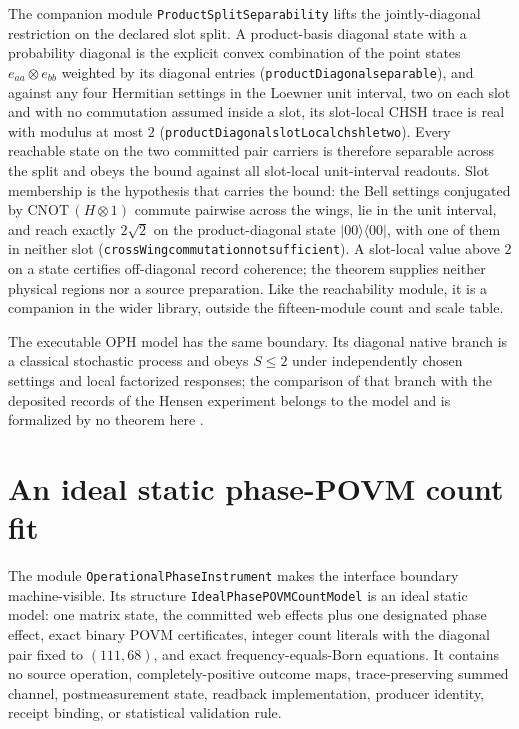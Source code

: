 \documentclass[11pt]{article}
\renewcommand{\_}{\textunderscore\allowbreak}
\theoremstyle{remark}
\begin{document}
The companion module \texttt{ProductSplitSeparability} lifts the jointly-diagonal
restriction on the declared slot split. A product-basis diagonal state with a probability
diagonal is the explicit convex combination of the point states $e_{aa}\otimes e_{bb}$
weighted by its diagonal entries (\texttt{productDiagonal\_separable}), and against any
four Hermitian settings in the Loewner unit interval, two on each slot and with no
commutation assumed inside a slot, its slot-local CHSH trace is real with modulus at most
$2$ (\texttt{productDiagonal\_slotLocal\_chsh\_le\_two}). Every reachable state on the
two committed pair carriers is therefore separable across the split and obeys the bound
against all slot-local unit-interval readouts. Slot membership is the hypothesis that carries
the bound: the Bell
settings conjugated by $\mathrm{CNOT}\,(H\otimes1)$ commute pairwise across the wings, lie
in the unit interval, and reach exactly $2\sqrt2$ on the product-diagonal state
$|00\rangle\langle00|$, with one of them in neither slot
(\texttt{crossWing\_commutation\_not\_sufficient}). A slot-local value above $2$ on a state certifies
off-diagonal record coherence; the theorem supplies neither physical regions nor a source preparation.
Like the reachability module, it is a companion in the wider library, outside the
fifteen-module count and scale table.

The executable OPH model has the same boundary. Its diagonal native branch is a
classical stochastic process and obeys $S\le2$ under independently chosen
settings and local factorized responses; the comparison of that branch with
the deposited records of the Hensen experiment \cite{hensen2015} belongs to
the model and is formalized by no theorem here \cite{ophbell}.

\section{An ideal static phase-POVM count fit}
\label{sec:phase-instrument}

The module \texttt{OperationalPhaseInstrument} makes the interface
boundary machine-visible. Its structure
\texttt{IdealPhasePOVMCountModel} is an ideal static model: one matrix state,
the committed web effects plus one designated phase effect, exact binary POVM
certificates, integer count literals with the diagonal pair fixed to
$(111,68)$, and exact frequency-equals-Born equations. It contains no source
operation, completely-positive outcome maps, trace-preserving summed channel,
postmeasurement state, readback implementation, producer identity, receipt
binding, or statistical validation rule.
\end{document}
